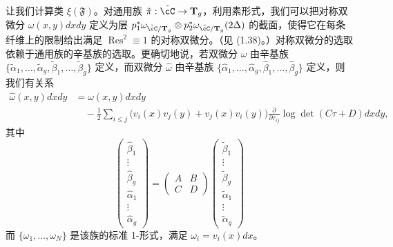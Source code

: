 让我们计算类 $\xi(\mathfrak F)$。对通用族 $\tilde\pi:\tilde\cC\to\mathbf T_g$，利用素形式，我们可以把对称双微分 $\omega(x,y)dxdy$ 定义为层 $p_1^*\omega_{\tilde\cC/\mathbf T_g}\otimes p_2^*\omega_{\tilde\cC/\mathbf T_g}(2\Delta)$ 的截面，使得它在每条纤维上的限制给出满足 $\operatorname{Res}^2\equiv1$ 的对称双微分。（见 (1.38)。）对称双微分的选取依赖于通用族的辛基族的选取。更确切地说，若双微分 $\omega$ 由辛基族 $\{\tilde\alpha_1,\dots,\tilde\alpha_g,\tilde\beta_1,\dots,\tilde\beta_g\}$ 定义，而双微分 $\hat\omega$ 由辛基族 $\{\hat\alpha_1,\dots,\hat\alpha_g,\hat\beta_1,\dots,\hat\beta_g\}$ 定义，则我们有关系
\begin{align}
 \hat\omega(x,y)dxdy&=\omega(x,y)dxdy \tag{5.18}\\
 &\quad-\frac{1}{2}\sum_{i\le j}\big(v_i(x)v_j(y)+v_j(x)v_i(y)\big)
 \frac{\partial}{\partial\tau_{ij}}\log\det(C\tau+D)dxdy, \nonumber
\end{align}
其中
\begin{equation}
 \begin{pmatrix}\hat\beta_1\\ \vdots\\ \hat\beta_g\\ \hat\alpha_1\\ \vdots\\ \hat\alpha_g\end{pmatrix}
 =\begin{pmatrix}A&B\\C&D\end{pmatrix}
 \begin{pmatrix}\tilde\beta_1\\ \vdots\\ \tilde\beta_g\\ \tilde\alpha_1\\ \vdots\\ \tilde\alpha_g\end{pmatrix} \tag{5.19}
\end{equation}
而 $\{\omega_1,\dots,\omega_N\}$ 是该族的标准 1-形式，满足 $\omega_i=v_i(x)dx$。


